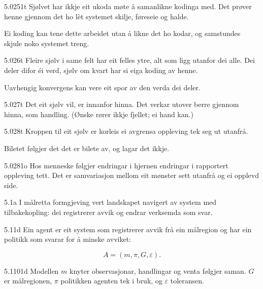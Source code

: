 \begin{formproposition}{5.0251}{t}
Sjølvet har ikkje eit ukoda møte å samanlikne kodinga med. Det prøver henne gjennom det ho lèt systemet skilje, føreseie og halde.

Ei koding kan tene dette arbeidet utan å likne det ho kodar, og samstundes skjule noko systemet treng.
\end{formproposition}

\begin{formproposition}{5.026}{t}
Fleire sjølv i same felt har eit felles ytre, alt som ligg utanfor dei alle. Dei deler difor éi verd, sjølv om kvart har si eiga koding av henne.

Uavhengig konvergens kan vere eit spor av den verda dei deler.
\end{formproposition}

\begin{formproposition}{5.027}{t}
Det eit sjølv vil, er innanfor hinna. Det verkar utover berre gjennom hinna, som handling. (Ønske rører ikkje fjellet; ei hand kan.)
\end{formproposition}

\begin{formproposition}{5.028}{t}
Kroppen til eit sjølv er korleis ei avgrensa oppleving tek seg ut utanfrå.

Biletet følgjer det det er bilete av, og lagar det ikkje.
\end{formproposition}

\begin{formproposition}{5.0281}{o}
Hos menneske følgjer endringar i hjernen endringar i rapportert oppleving tett. Det er samvariasjon mellom eit mønster sett utanfrå og ei opplevd side.
\end{formproposition}

\begin{formproposition}{5.1}{a}
I målretta formgjeving vert landskapet navigert av system med tilbakekopling: dei registrerer avvik og endrar verksemda som svar.
\end{formproposition}

\begin{formproposition}{5.11}{d}
Ein agent er eit system som registrerer avvik frå ein målregion og har ein politikk som svarar for å minske avviket:

\[
A=(m,\pi,G,\varepsilon).
\]
\end{formproposition}

\begin{formproposition}{5.1101}{d}
Modellen \(m\) knyter observasjonar, handlingar og venta følgjer saman. \(G\) er målregionen, \(\pi\) politikken agenten tek i bruk, og \(\varepsilon\) toleransen.
\end{formproposition}

